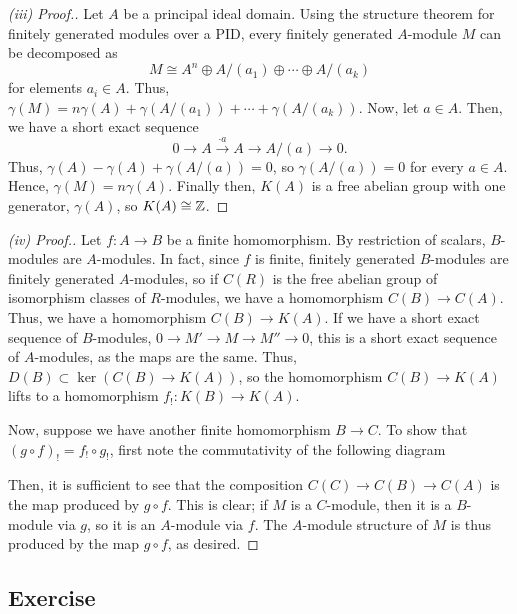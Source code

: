 \begin{proof}[(iii) Proof.]
Let $A$ be a principal ideal domain. Using the structure theorem for finitely generated modules over a PID, every finitely generated $A$-module $M$ can be decomposed as
$$M \cong A^n \oplus A/(a_1) \oplus \cdots \oplus A/(a_k)$$
for elements $a_i \in A$. Thus, $\gamma(M) = n\gamma(A) + \gamma(A/(a_1)) + \cdots + \gamma(A/(a_k))$. Now, let $a \in A$. Then, we have a short exact sequence
$$0 \to A \xrightarrow{\cdot a} A \to A/(a) \to 0.$$
Thus, $\gamma(A) - \gamma(A) + \gamma(A/(a)) = 0$, so $\gamma(A/(a)) = 0$ for every $a \in A$. Hence, $\gamma(M) = n\gamma(A)$. Finally then, $K(A)$ is a free abelian group 
with one generator, $\gamma(A)$, so $K(A) \cong \mathbb{Z}$.
\end{proof}

\begin{proof}[(iv) Proof.]
Let $f : A \to B$ be a finite homomorphism. By restriction of scalars, $B$-modules are $A$-modules. In fact, since $f$ is finite, finitely generated $B$-modules are 
finitely generated $A$-modules, so if $C(R)$ is the free abelian group of isomorphism classes of $R$-modules, we have a homomorphism $C(B) \to C(A)$. Thus, we have a 
homomorphism $C(B) \to K(A)$. If we have a short exact sequence of $B$-modules, $0 \to M' \to M \to M'' \to 0$, this is a short exact sequence of $A$-modules, as the maps
are the same. Thus, $D(B) \subset \ker (C(B) \to K(A))$, so the homomorphism $C(B) \to K(A)$ lifts to a homomorphism $f_! : K(B) \to K(A)$.

Now, suppose we have another finite homomorphism $B \to C$. To show that $(g \circ f)_! = f_! \circ g_!$, first note the commutativity of the following diagram
\begin{center}
\end{center}
Then, it is sufficient to see that the composition $C(C) \to C(B) \to C(A)$ is the map produced by $g \circ f$. This is clear; if $M$ is a $C$-module, then it is a $B$-module
via $g$, so it is an $A$-module via $f$. The $A$-module structure of $M$ is thus produced by the map $g \circ f$, as desired.
\end{proof}

\subsection{Exercise}\label{7.27}

